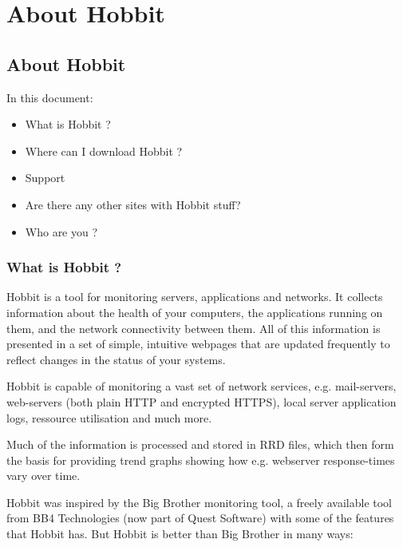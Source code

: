 \chapter{About Hobbit}
\label{chap:About Hobbit}


\section{About Hobbit}


In this document:
\begin{itemize}
\item What is Hobbit ?
\item Where can I download Hobbit ?
\item Support
\item Are there any other sites with Hobbit stuff?
\item Who are you ?

\end{itemize}
\subsection{What is Hobbit ?}


 Hobbit is a tool for monitoring servers, applications and
 networks. It collects information about the health of your computers,
 the applications running on them, and the network connectivity
 between them. All of this information is presented in a set of
 simple, intuitive webpages that are updated frequently to reflect
 changes in the status of your systems.



 Hobbit is capable of monitoring a vast set of network services,
 e.g. mail-servers, web-servers (both plain HTTP and encrypted HTTPS),
 local server application logs, ressource utilisation and much more.



 Much of the information is processed and stored in RRD files, which
 then form the basis for providing trend graphs showing how
 e.g. webserver response-times vary over time.



 Hobbit was inspired by the Big Brother monitoring tool, a freely
 available tool from BB4 Technologies (now part of Quest Software)
 with some of the features that Hobbit has. But Hobbit is better than
 Big Brother in many ways:

